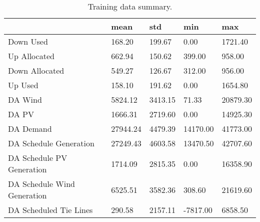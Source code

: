 \begin{table}[H] 
    \caption{Training data summary. \label{training_data_sum}}
    \begin{tabularx}{\textwidth}{CCCCC}
    \toprule
    & \textbf{mean}	& \textbf{std}	& \textbf{min} & \textbf{max}\\
    \midrule
    Down Used & 168.20 & 199.67 & 0.00 & 1721.40 \\
    Up Allocated & 662.94 & 150.62 & 399.00 & 958.00 \\
    Down Allocated & 549.27 & 126.67 & 312.00 & 956.00 \\
    Up Used & 158.10 & 191.62 & 0.00 & 1654.80 \\
    DA Wind & 5824.12 & 3413.15 & 71.33 & 20879.30 \\
    DA PV & 1666.31 & 2719.60 & 0.00 & 14925.30 \\
    DA Demand & 27944.24 & 4479.39 & 14170.00 & 41773.00 \\
    DA Schedule Generation & 27249.43 & 4603.58 & 13470.50 & 42707.60 \\
    DA Schedule PV Generation & 1714.09 & 2815.35 & 0.00 & 16358.90 \\
    DA Schedule Wind Generation & 6525.51 & 3582.36 & 308.60 & 21619.60 \\
    DA Scheduled Tie Lines & 290.58 & 2157.11 & -7817.00 & 6858.50 \\
    \bottomrule
    \end{tabularx}
\end{table}

